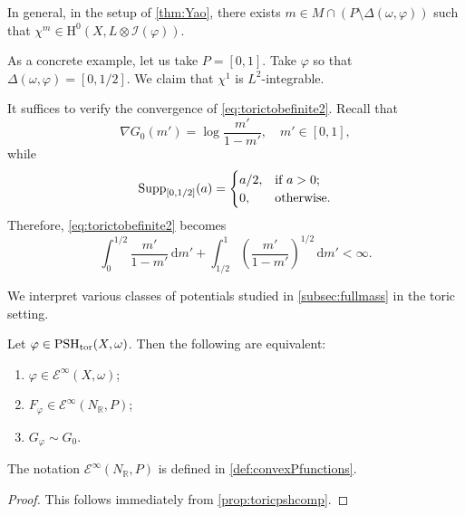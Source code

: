 \begin{example}\label{ex:toric-ample:L966}
    In general, in the setup of \cref{thm:Yao}, there exists $m\in M\cap (P\setminus \Delta(\omega,\varphi))$ such that $\chi^m\in \mathrm{H}^0(X,L\otimes \mathcal{I}(\varphi))$.

    As a concrete example, let us take $P=[0,1]$. Take $\varphi$ so that $\Delta(\omega,\varphi)=[0,1/2]$. We claim that $\chi^1$ is $L^2$-integrable.

    It suffices to verify the convergence of \eqref{eq:torictobefinite2}. Recall that
    \[
    \nabla G_0(m')=\log \frac{m'}{1-m'},\quad m'\in [0,1],
    \]
    while
    \[
    \operatorname{Supp}_{[0,1/2]}(a)=
    \begin{cases}
        a/2,&\textup{if }a>0;\\
        0,&\textup{otherwise}.
    \end{cases}
    \]
    Therefore, \eqref{eq:torictobefinite2} becomes
    \[
    \int_0^{1/2} \frac{m'}{1-m'}\,\mathrm{d}m'+\int_{1/2}^1  \left(\frac{m'}{1-m'}\right)^{1/2}\,\mathrm{d}m'<\infty.
    \]
\end{example}

We interpret various classes of potentials studied in \cref{subsec:fullmass} in the toric setting.
\begin{proposition}\label{prop:toric-ample:L990}
    Let $\varphi\in \mathrm{PSH}_{\mathrm{tor}}(X,\omega)$. Then the following are equivalent:
    \begin{enumerate}
        \item\label{itm:chapter-toric:L976:1} $\varphi\in \mathcal{E}^{\infty}(X,\omega)$;
        \item\label{itm:chapter-toric:L976:2} $F_{\varphi}\in \mathcal{E}^{\infty}(N_{\mathbb{R}},P)$;
        \item\label{itm:chapter-toric:L976:3} $G_{\varphi}\sim G_0$.
    \end{enumerate}
\end{proposition}
The notation $\mathcal{E}^{\infty}(N_{\mathbb{R}},P)$ is defined in \cref{def:convexPfunctions}.
\begin{proof}
    This follows immediately from \cref{prop:toricpshcomp}.
\end{proof}

